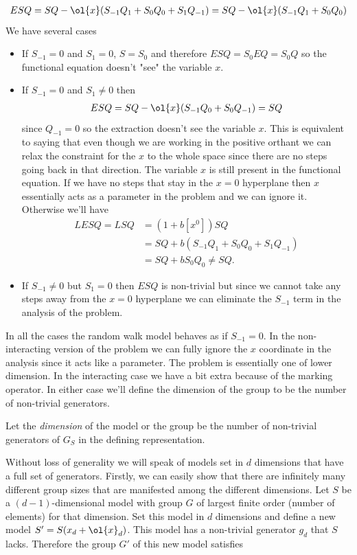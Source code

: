 \begin{align}
	ESQ = SQ - \ol{x}(S_{-1}Q_1 + S_0 Q_0 + S_1 Q_{-1})= SQ - \ol{x}(S_{-1}Q_1 + S_0 Q_0)
\end{align}
We have several cases
\begin{itemize}
\item[1)] If $S_{-1} = 0$ and $S_1 = 0$, $S = S_0$ and therefore $ESQ = S_0EQ = S_0Q$ so the functional equation doesn't "see" the variable $x$.
\item[2)] If $S_{-1} = 0$ and $S_1 \neq 0$ then
\begin{align}
	ESQ = SQ - \ol{x}(S_{-1}Q_0 + S_0 Q_{-1}) = SQ
\end{align}
since $Q_{-1} = 0$ so the extraction doesn't see the variable $x$. This is equivalent to saying that even though we are working in the positive orthant we can relax the constraint for the $x$ to the whole space since there are no steps going back in that direction. The variable $x$ is still present in the functional equation. If we have no steps that stay in the $x = 0$ hyperplane then $x$ essentially acts as a parameter in the problem and we can ignore it. Otherwise we'll have
\begin{align}
	LESQ = LSQ &= (1+b[x^0])SQ \\&= SQ + b(S_{-1}Q_1+S_0Q_0+S_1Q_{-1}) \\&= SQ + bS_0Q_0 \neq SQ.
\end{align}
\item[3)] If $S_{-1}\neq 0$ but $S_1 = 0$ then $ESQ$ is non-trivial but since we cannot take any steps away from the $x = 0$ hyperplane we can eliminate the $S_{-1}$ term in the analysis of the problem.
\end{itemize}
In all the cases the random walk model behaves as if $S_{-1} = 0$. In the non-interacting version of the problem we can fully ignore the $x$ coordinate in the analysis since it acts like a parameter. The problem is essentially one of lower dimension. In the interacting case we have a bit extra because of the marking operator. In either case we'll define the dimension of the group to be the number of non-trivial generators.
\begin{definition} Let the \emph{dimension} of the model or the group be the number of non-trivial generators of $G_S$ in the defining representation.
\end{definition}
Without loss of generality we will speak of models set in $d$ dimensions that have a full set of generators. Firstly, we can easily show that there are infinitely many different group sizes that are manifested among the different dimensions. Let $S$ be a $(d-1)$-dimensional model with group $G$ of largest finite order (number of elements) for that dimension. Set this model in $d$ dimensions and define a new model $S' = S(x_d+\ol{x}_d)$. This model has a non-trivial generator $g_d$ that $S$ lacks. Therefore the group $G'$ of this new model satisfies
